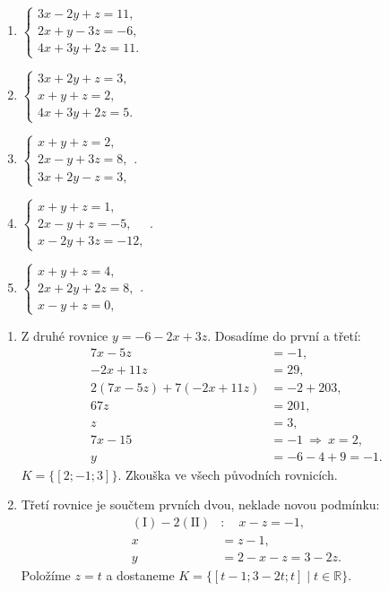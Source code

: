 \documentclass[11pt,a4paper]{article}
\begin{document}
\begin{zadaniReseniBox}[title={Domácí úkol}]
\begin{enumerate}[label=\alph*)]
\item $\begin{cases}3x-2y+z=11,\\2x+y-3z=-6,\\4x+3y+2z=11.\end{cases}$
\item $\begin{cases}3x+2y+z=3,\\x+y+z=2,\\4x+3y+2z=5.\end{cases}$
\item $\begin{cases}x+y+z=2,\\2x-y+3z=8,\\3x+2y-z=3,\end{cases}$.
\item $\begin{cases}x+y+z=1,\\2x-y+z=-5,\\x-2y+3z=-12,\end{cases}$.
\item $\begin{cases}x+y+z=4,\\2x+2y+2z=8,\\x-y+z=0,\end{cases}$.
\end{enumerate}
\tcblower
\begin{enumerate}[label=\alph*)]
\item
Z druhé rovnice $y=-6-2x+3z$. Dosadíme do první a třetí:
\[\begin{aligned}
7x-5z&=-1,\\
-2x+11z&=29,\\
2(7x-5z)+7(-2x+11z)&=-2+203,\\
67z&=201,\\
z&=3,\\
7x-15&=-1\ \Rightarrow\ x=2,\\
y&=-6-4+9=-1.
\end{aligned}\]
$K=\{[2;-1;3]\}$. Zkouška ve všech původních rovnicích.

\item
Třetí rovnice je součtem prvních dvou, neklade novou podmínku:
\[\begin{aligned}
(\mathrm I)-2(\mathrm{II})&:\quad x-z=-1,\\
x&=z-1,\\
y&=2-x-z=3-2z.
\end{aligned}\]
Položíme $z=t$ a dostaneme $K=\{[t-1;3-2t;t]\mid t\in\mathbb R\}$.


\end{enumerate}
\end{zadaniReseniBox}
\end{document}
